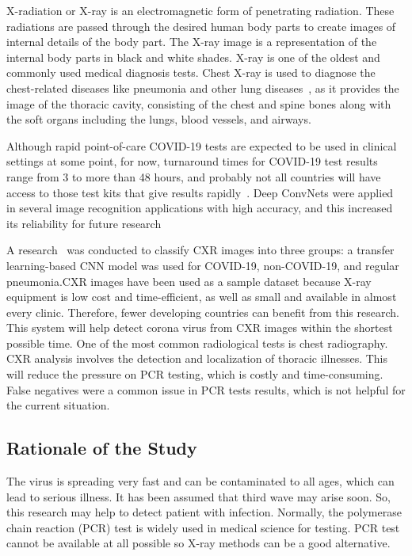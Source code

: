 X-radiation or X-ray is an electromagnetic form of penetrating radiation. These radiations are passed through the desired human body parts to create images of internal details of the body part. The X-ray image is a representation of the internal body parts in black and white shades. X-ray is one of the oldest and commonly used medical diagnosis tests. Chest X-ray is used to diagnose the chest-related diseases like pneumonia and other lung diseases~\cite{Rubin2020}, as it provides the image of the thoracic cavity, consisting of the chest and spine bones along with the soft organs including the lungs, blood vessels, and airways. 

Although rapid point-of-care COVID-19 tests are expected to be used in clinical settings at some point, for now, turnaround times for COVID-19 test results range from 3 to more than 48 hours, and probably not all countries will have access to those test kits that give results rapidly~\cite{ricxr}. Deep ConvNets were applied in several image recognition applications with high accuracy, and this increased its reliability for future research  

A research~\cite{Rubin2020} was conducted to classify CXR images into three groups: a transfer learning-based CNN model was used for COVID-19, non-COVID-19, and regular pneumonia.CXR images have been used as a sample dataset because X-ray equipment is low cost and time-efficient, as well as small and available in almost every clinic. Therefore, fewer developing countries can benefit from this research. This system will help detect corona virus from CXR images within the shortest possible time. One of the most common radiological tests is chest radiography. CXR analysis involves the detection and localization of thoracic illnesses. This will reduce the pressure on PCR testing, which is costly and time-consuming. False negatives were a common issue in PCR tests results, which is not helpful for the current situation. 

\subsection{Rationale of the Study}

The virus is spreading very fast and can be contaminated to all ages, which can lead to serious illness. It has been assumed that third wave may arise soon. So, this research may help to detect patient with infection. Normally, the polymerase chain reaction (PCR) test is widely used in medical science for testing. PCR test cannot be available at all possible so X-ray methods can be a good alternative. 

